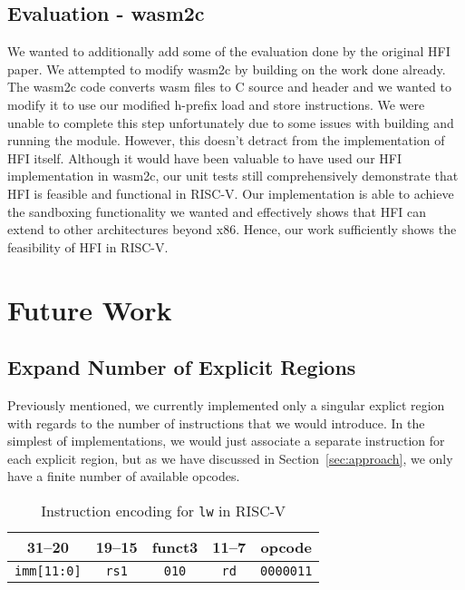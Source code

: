 \documentclass[conference,compsoc]{IEEEtran}
\begin{document}
\subsection{Evaluation - wasm2c}
We wanted to additionally add some of the evaluation done by the original HFI paper. We attempted to modify wasm2c by building on the work done already. The wasm2c code converts wasm files to C source and header and we wanted to modify it to use our modified h-prefix load and store instructions. We were unable to complete this step unfortunately due to some issues with building and running the module. However, this doesn't detract from the implementation of HFI itself. Although it would have been valuable to have used our HFI implementation in wasm2c, our unit tests still comprehensively demonstrate that HFI is feasible and functional in RISC-V. Our implementation is able to achieve the sandboxing functionality we wanted and effectively shows that HFI can extend to other architectures beyond x86. Hence, our work sufficiently shows the feasibility of HFI in RISC-V.

\section{Future Work}
\label{sec:future-work}

\subsection{Expand Number of Explicit Regions}
Previously mentioned, we currently implemented only a singular explict region with regards to the number of instructions that we would introduce.
In the simplest of implementations, we would just associate a separate instruction for each explicit region, but as we have discussed in Section~\ref{sec:approach}, we only have a finite number of available opcodes.

\begin{table}[H]
  \centering
  \caption{Instruction encoding for \texttt{lw} in RISC-V}
  {\fontsize{6.5}{7.5}\selectfont
  \begin{tabular}{|c|c|c|c|c|}
  \hline
  \textbf{31--20} & \textbf{19--15} & \textbf{funct3} & \textbf{11--7} & \textbf{opcode} \\
  \hline
  \texttt{imm[11:0]} & \texttt{rs1} & \texttt{010} & \texttt{rd} & \texttt{0000011} \\
  \hline
  \end{tabular}
  }
  \label{tab:lw-encoding}
  \end{table}
  
\end{document}
